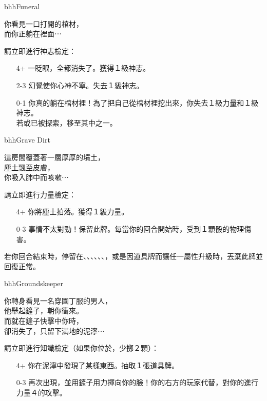 \begin{EventCard}{bhh}{Funeral}
  \begin{CardStory}
    你看見一口打開的棺材，\\
    而你正躺在裡面⋯
  \end{CardStory}
  請立即進行神志檢定：
  \begin{itemize}
    \item[4+] 一眨眼，全都消失了。獲得１級神志。
    \item[2-3] 幻覺使你心神不寧。失去１級神志。
    \item[0-1] 你真的躺在棺材裡！為了把自己從棺材裡挖出來，你失去１級力量和１級神志。\\
               若或已被探索，移至其中之一。
  \end{itemize}
\end{EventCard}%
\linebreak[0]%
\begin{EventCard}{bhh}{Grave Dirt}
  \begin{CardStory}
    這房間覆蓋著一層厚厚的墳土，\\
    塵土飄至皮膚，\\
    你吸入肺中而咳嗽⋯
  \end{CardStory}
  請立即進行力量檢定：
  \begin{itemize}
    \item[4+] 你將塵土拍落。獲得１級力量。
    \item[0-3] 事情不太對勁！保留此牌。每當你的回合開始時，受到１顆骰的物理傷害。
  \end{itemize}
  若你回合結束時，停留在、、、、、、，或是因道具牌而讓任一屬性升級時，丟棄此牌並回復正常。\smallbreak
\end{EventCard}%
\linebreak[0]%
\begin{EventCard}{bhh}{Groundskeeper}
  \begin{CardStory}
    你轉身看見一名穿園丁服的男人，\\
    他舉起鏟子，朝你衝來。\\
    而就在鏟子快擊中你時，\\
    卻消失了，只留下滿地的泥濘⋯
  \end{CardStory}
  請立即進行知識檢定（如果你位於，少擲２顆）：
  \begin{itemize}
    \item[4+] 你在泥濘中發現了某樣東西。抽取１張道具牌。
    \item[0-3] \ThisName{}再次出現，並用鏟子用力揮向你的臉！你的右方的玩家代替\ThisName{}，對你的進行力量４的攻擊。
  \end{itemize}
\end{EventCard}%
